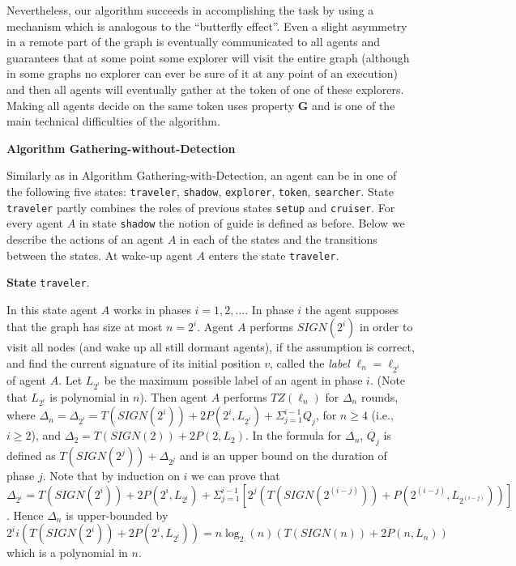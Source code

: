 \documentclass[11pt]{article}
\begin{document}
Nevertheless, our algorithm succeeds in accomplishing the task by using a mechanism which is analogous to the ``butterfly effect''.
Even a slight asymmetry in a remote part of the graph is eventually communicated to all agents and
guarantees that at some point some explorer will visit the entire graph (although in some graphs no explorer can ever be sure of it at any point of an execution) and then all agents will eventually gather at the token of one of these explorers. Making all agents decide on the same token uses property {\bf G}
and is one of the main technical difficulties of the algorithm.

 \vspace*{0.2cm}
 
  \noindent
{\bf Algorithm Gathering-without-Detection}

 Similarly as in Algorithm Gathering-with-Detection,  an agent can be in one of the following five states: {\tt traveler}, {\tt shadow}, {\tt explorer},  {\tt token}, {\tt searcher}.
 State {\tt traveler} partly combines the roles of previous states {\tt setup} and {\tt cruiser}. 
 For every agent $A$ in state  {\tt shadow} the notion of guide is defined as before. 
 Below we describe the actions of an agent $A$ in each of the states and the transitions between the states. At wake-up agent $A$ enters the state  {\tt traveler}.
 
  \vspace*{0.2cm}
 
  \noindent
  {\bf State} {\tt traveler}.
  
  {In this state agent $A$ works in phases  {$i=1,2,\dots$}. In phase $i$ the agent supposes that the graph has size at most $n=2^i$.
 {Agent $A$ performs $SIGN(2^i)$ in order to visit all nodes (and wake up all still dormant agents), if the assumption is correct, and find the current signature of its initial position $v$, called the {\em label} $\ell_{n}=\ell_{2^i}$ of agent $A$.}
 Let $L_{2^i}$ be the maximum possible label of an agent in phase $i$. (Note that $L_{2^i}$ is polynomial in $n$).
 Then  agent $A$ performs $TZ(\ell_n)$ for $\Delta_n$ rounds, where {$\Delta_n=\Delta_{2^i}=T(SIGN(2^i))+2P(2^i,L_{2^i})+ \Sigma_{j=1}^{i-1}Q_j $}, for {$n\geq 4$ (i.e., $i\geq2$), and $\Delta_2=T(SIGN(2))+2P(2,L_2)$. In the formula for $\Delta_n$, $Q_j$ is defined as {$T(SIGN(2^j))+\Delta_{2^j}$} and is an upper bound on the duration of phase $j$. Note that by induction on $i$ we can prove that $\Delta_{2^i}= T(SIGN(2^i))+2P(2^i,L_{2^i}) + \Sigma_{j=1}^{i-1}[2^j(T(SIGN(2^{(i-j)}))+P(2^{(i-j)},L_{2^{(i-j)}}))]$. Hence $\Delta_{n}$ is upper-bounded by\\ $2^ii(T(SIGN(2^i))+2P(2^i,L_{2^i}))=n\log_2(n)(T(SIGN(n))+2P(n,L_{n}))$ which is a polynomial in $n$.}}
\end{document}

